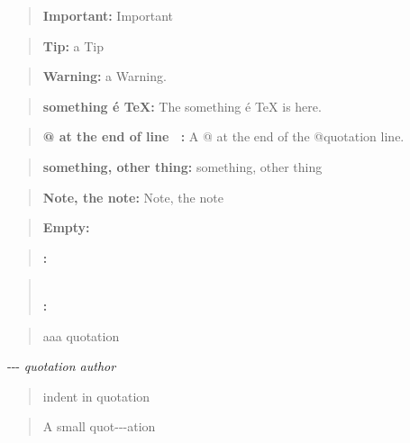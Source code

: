\documentclass{book}
\begin{document}
\begin{quote}
\textbf{Important:} Important
\end{quote}

\begin{quote}
\textbf{Tip:} a Tip
\end{quote}

\begin{quote}
\textbf{Warning:} a Warning.
\end{quote}

\begin{quote}
\textbf{something \'{e} \TeX{}:} The something \'{e} \TeX{} is here.
\end{quote}

\begin{quote}
\textbf{@ at the end of line \ {}:} A @ at the end of the @quotation line.
\end{quote}

\begin{quote}
\textbf{something, other thing:} something, other thing
\end{quote}

\begin{quote}
\textbf{Note, the note:} Note, the note
\end{quote}

\begin{quote}
\end{quote}

\begin{quote}
\textbf{Empty:} \end{quote}

\begin{quote}
\textbf{:} \end{quote}

\begin{quote}
\textbf{\leavevmode{}\\:} \end{quote}

\begin{quote}
aaa quotation
\end{quote}
\begin{center}
{-}{-}{-} \emph{quotation author}
\end{center}

\begin{quote}
indent in quotation
\end{quote}

\begin{quote}
\begin{footnotesize}
A small quot{-}{-}{-}ation
\end{footnotesize}
\end{quote}
\end{document}
